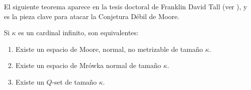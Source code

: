     El siguiente teorema aparece en la tesis doctoral de Franklin David Tall (ver \cite{tallTesis}), y es la pieza clave para atacar la Conjetura Débil de Moore.

    \begin{teorema}[Tall]\label{teo-EquivPDM}
        Si $\kappa$ es un cardinal infinito, son equivalentes:
        \begin{enumerate}
            \item Existe un espacio de Moore, normal, no metrizable de tamaño $\kappa$.
            \item Existe un espacio de Mrówka normal de tamaño $\kappa$.
            \item Existe un $Q$-set de tamaño $\kappa$.
        \end{enumerate}
    \end{teorema}

